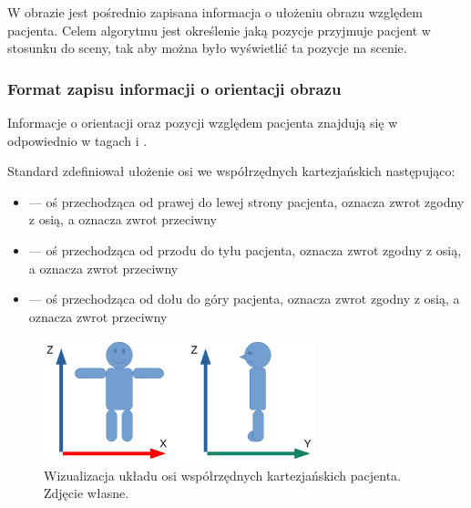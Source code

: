 \label{sec:algorithm-imageorientationindicator}

W obrazie \DICOM jest pośrednio zapisana informacja o ułożeniu obrazu względem pacjenta.
Celem algorytmu jest określenie jaką pozycje przyjmuje pacjent w stosunku do sceny, tak aby można było wyświetlić ta pozycje na scenie.

\subsubsection{Format zapisu informacji o orientacji obrazu}

\par
Informacje o orientacji oraz pozycji względem pacjenta znajdują się w odpowiednio w tagach  i .

\par
Standard \DICOM zdefiniował ułożenie osi we współrzędnych kartezjańskich następująco:
\begin{itemize}
    \item {} --- oś przechodząca od prawej do lewej strony pacjenta,  oznacza zwrot zgodny z osią, a  oznacza zwrot przeciwny

    \item {} --- oś przechodząca od przodu do tyłu pacjenta,  oznacza zwrot zgodny z osią, a  oznacza zwrot przeciwny

    \item {} --- oś przechodząca od dołu do góry pacjenta,  oznacza zwrot zgodny z osią, a  oznacza zwrot przeciwny

\end{itemize}

\begin{figure}[!htbp]
    \centering
    \includegraphics[width=0.7\textwidth]{img/imageorientationindicator-003.pdf}
    \caption{Wizualizacja układu osi współrzędnych kartezjańskich pacjenta. Zdjęcie własne.}
    \label{fig:imageorientationindicator2}
\end{figure}

